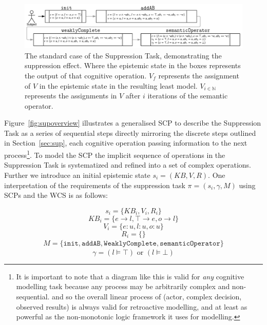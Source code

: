 \documentclass[
11pt, %
english, %
singlespacing, %
headsepline, %
]{MastersDoctoralThesis} %
\begin{document}
\begin{figure}
\begin{center}
 \centering \includegraphics[width=\linewidth]{suppressionSCP_normal}
\caption{The standard case of the Suppression Task, demonstrating the suppression effect. Where the epistemic state in the boxes represents the output of that cognitive operation. $V_f$ represents the assignment of $V$ in the epistemic state in the resulting least model. $V_{i\in \mathbb{N}}$ represents the assignments in $V$ after $i$ iterations of the semantic operator.}
\label {fig:supnormal}
\end{center}
\end{figure}

Figure~\ref{fig:supoverview} illustrates a generalised SCP to describe the Suppression Task as a series of sequential steps directly mirroring the discrete steps outlined in Section~\ref{sec:sup}, each cognitive operation passing information to the next process\footnote{It is important to note that a diagram like this is valid for \textit{any} cognitive modelling task because any process may be arbitrarily complex and non-sequential. and so the overall linear process of (actor, complex decision, observed results) is always valid for retroactive modelling, and at least as powerful as the non-monotonic logic framework it uses for modelling.}. To model the SCP the implicit sequence of operations in the Suppression Task is systematized and refined into a set of complex operations. Further we introduce an initial epistemic state $s_i=(KB,V,R)$. One interpretation of the requirements of the suppression task $\pi=(s_i,\gamma,M)$ using SCPs and the WCS is as follows: 
 
 
 
 


\[s_i=\{KB_i, V_i, R_i\} \]
\[KB_i=\{e \rightarrow l, \top \rightarrow e, o \rightarrow l\} \]
\[V_i=\{e:u, l:u, o:u\} \]
\[R_i=\{\} \]
\[
\begin{split}
M= \{\texttt{init}, \texttt{addAB}, \texttt{WeaklyComplete}, \texttt{semanticOperator}\}
\end{split}
\]
\[\gamma = (l\models \top) \textrm{ or } (l \models \bot)\]

\end{document}
